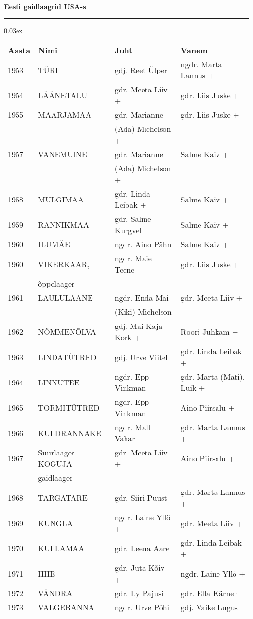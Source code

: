 \documentclass[12pt]{extbook}
\begin{document}
\centerline{ {\bf {\large Eesti  gaidlaagrid  USA-s}}}
\vspace{0.1in}
\hrule height 0.05ex
{\centering\scriptsize\arrayrulewidth 0.03ex
\begin{tabular*}{1.0\textwidth}{@{\extracolsep{\fill}}@{}l@{}@{}l@{}@{}l@{}@{}l@{}}
\bf{Aasta}	&	\bf{Nimi}				&	\bf{Juht}				&	\bf{Vanem}\\[2mm]
	1953	&	T\"URI					&	gdj. Reet \"Ulper		&	ngdr. Marta Lannus +\\[2mm]
	1954	&	L\"A\"ANETALU			&	gdr. Meeta Liiv +		&	gdr. Liis Juske +\\[2mm]
	1955	&	MAARJAMAA				&	gdr. Marianne 			&	gdr. Liis Juske +\\
			&							&	(Ada) Michelson +		&	\\[2mm]
	1957	&	VANEMUINE				&	gdr. Marianne 		 	&	Salme Kaiv +\\
			&							&	(Ada) Michelson +		&	\\[2mm]
	1958	&	MULGIMAA				&	gdr. Linda Leibak +		&	Salme Kaiv +\\[2mm]
	1959	&	RANNIKMAA				&	gdr. Salme Kurgvel +	&	Salme Kaiv +\\[2mm]
	1960	&	ILUM\"AE				&	ngdr. Aino P\"ahn		&	Salme Kaiv +\\[2mm]
	1960	&	VIKERKAAR, 				&	ngdr. Maie Teene		&	gdr. Liis Juske +\\
			&	\~oppelaager			&							&	\\[2mm]
	1961	&	LAULULAANE				&	ngdr. Enda-Mai 			&	gdr. Meeta Liiv +\\
			&							&	(Kiki) Michelson		&	\\[2mm]
	1962	&	N\~OMMEN\~OLVA			&	gdj. Mai Kaja Kork +	&	Roori Juhkam +\\[2mm]
	1963	&	LINDAT\"UTRED			&	gdj. Urve Viitel		&	gdr. Linda Leibak +\\[2mm]
	1964	&	LINNUTEE				&	ngdr. Epp Vinkman		&	gdr. Marta (Mati). Luik +\\[2mm]
	1965	&	TORMIT\"UTRED			&	ngdr. Epp Vinkman		&	Aino Piirsalu +\\[2mm]
	1966	&	KULDRANNAKE				&	ngdr. Mall Vahar		&	gdr. Marta Lannus +\\[2mm]
	1967	&	Suurlaager KOGUJA		&	gdr. Meeta Liiv +		&	Aino Piirsalu +\\
			&	gaidlaager				&							&	\\[2mm]
	1968	&	TARGATARE				&	gdr. Siiri Puust		&	gdr. Marta Lannus + \\[2mm]
	1969	&	KUNGLA					&	ngdr. Laine Yll\"o +	&	gdr. Meeta Liiv +\\[2mm]
	1970	&	KULLAMAA				&	gdr. Leena Aare			&	gdr. Linda Leibak +\\[2mm]
	1971	&	HIIE					&	gdr. Juta K\~oiv +		&	ngdr. Laine Yll\"o +\\[2mm]
	1972	&	V\"ANDRA				&	gdr. Ly Pajusi			&	gdr. Ella K\"arner\\[2mm]
	1973	&	VALGERANNA				&	ngdr. Urve P\~ohi		&	gdj. Vaike Lugus\\[2mm]
\end{tabular*}}
\end{document}
